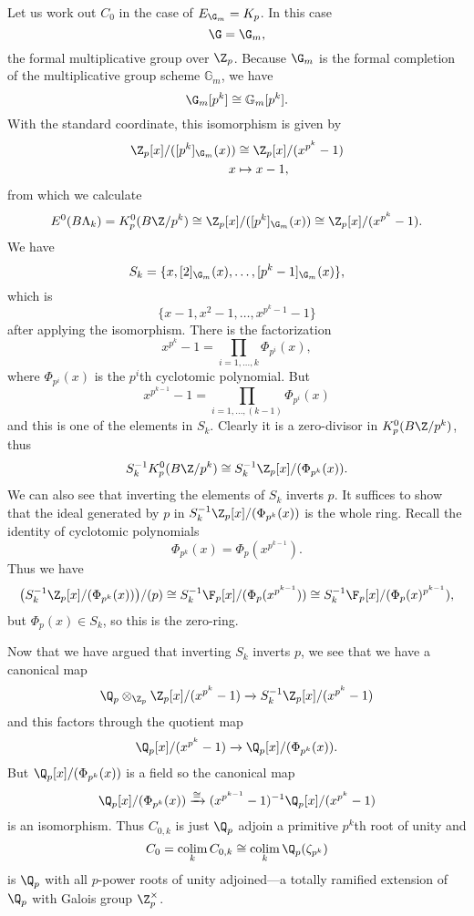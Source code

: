 \begin{example} \label{padicktheory}
Let us work out \(C_0\) in the case of \(E_{\G_m} = K_p\). In this case 
\[
\G = \G_m,
\]
the formal multiplicative group over \(\Z_p\).  Because \(\G_m\) is the formal completion of the multiplicative group scheme \(\mathbb G_m\), we have
\[
\G_m[p^k] \cong \mathbb{G}_m[p^k].
\]
With the standard coordinate, this isomorphism is given by
\begin{align*}
\Z_p[x]/([p^k]_{\G_m}(x)) & \cong \Z_p[x]/(x^{p^k}-1) \\
x & \mapsto x-1,
\end{align*}
from which we calculate 
\[
E^0(B\Lk) = K_{p}^0(B\Z/p^k) \cong \Z_p[x]/([p^k]_{\G_m}(x)) \cong \Z_p[x]/(x^{p^k}-1).
\]
We have
\[
S_k = \{x,[2]_{\G_m}(x),\ldots, [p^k-1]_{\G_m}(x)\},
\]
which is
\[
\{x-1,x^2-1, \ldots, x^{p^k-1}-1\}
\]
after applying the isomorphism.
There is the factorization
\[
x^{p^k}-1 = \prod_{i=1,\ldots,k}\Phi_{p^i}(x),
\]
where \(\Phi_{p^i}(x)\) is the \(p^i\)th cyclotomic polynomial. But
\[
x^{p^{k-1}}-1 = \prod_{i=1,\ldots,(k-1)}\Phi_{p^i}(x)
\]
and this is one of the elements in \(S_k\). Clearly it is a zero-divisor in \(K_{p}^0(B\Z/p^k)\), thus
\[
S_{k}^{-1}K_{p}^0(B\Z/p^k) \cong S_{k}^{-1}\Z_p[x]/(\Phi_{p^k}(x)).
\]
We can also see that inverting the elements of \(S_{k}\) inverts \(p\). It suffices to show that the ideal generated by \(p\) in \(S_{k}^{-1}\Z_p[x]/(\Phi_{p^k}(x))\) is the whole ring. Recall the identity of cyclotomic polynomials 
\[
\Phi_{p^k}(x) = \Phi_p(x^{p^{k-1}}).
\]
Thus we have
\[
\big ( S_{k}^{-1}\Z_p[x]/(\Phi_{p^k}(x)) \big )/(p) \cong S_{k}^{-1}\F_p[x]/(\Phi_{p}(x^{p^{k-1}})) \cong S_{k}^{-1}\F_p[x]/(\Phi_{p}(x)^{p^{k-1}}),
\]
but \(\Phi_{p}(x) \in S_k\), so this is the zero-ring.

Now that we have argued that inverting \(S_k\) inverts \(p\), we see that we have a canonical map
\[
\Q_p \otimes_{\Z_p} \Z_p[x]/(x^{p^k}-1) \xrightarrow{} S_{k}^{-1}\Z_p[x]/(x^{p^k}-1) 
\]
and this factors through the quotient map
\[
\Q_p[x]/(x^{p^k}-1) \xrightarrow{} \Q_p[x]/(\Phi_{p^k}(x)).
\]
But \(\Q_p[x]/(\Phi_{p^k}(x))\) is a field so the canonical map
\[
\Q_p[x]/(\Phi_{p^k}(x)) \xrightarrow{\cong} (x^{p^{k-1}}-1)^{-1}\Q_p[x]/(x^{p^k}-1)
\]
is an isomorphism. Thus \(C_{0,k}\) is just \(\Q_p\) adjoin a primitive \(p^k\)th root of unity and
\[
C_0 = \colim_k C_{0,k} \cong \colim_k \Q_p(\zeta_{p^k})
\]
is \(\Q_p\) with all \(p\)-power roots of unity adjoined---a totally ramified extension of \(\Q_p\) with Galois group \(\Z_{p}^{\times}\).
\end{example}

